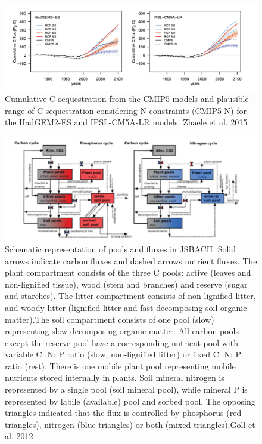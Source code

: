 \documentclass[
  12pt,
  oneside]{book}
\begin{document}
\begin{figure}

{\centering \includegraphics[width=0.8\linewidth]{figures/chap5/f520_zhaele} 

}

\caption{Cumulative C sequestration from the CMIP5 models and plausible range of C sequestration considering N constraints (CMIP5-N) for the HadGEM2-ES and IPSL-CM5A-LR models. Zhaele et al. 2015}\label{fig:f520}
\end{figure}

\begin{figure}

{\centering \includegraphics[width=0.8\linewidth]{figures/chap5/f521_goll_jsbach} 

}

\caption{Schematic representation of pools and fluxes in JSBACH. Solid arrows indicate carbon fluxes and dashed arrows nutrient fluxes. The plant compartment consists of the three C pools: active (leaves and non-lignified tissue), wood (stem and branches) and reserve (sugar and starches). The litter compartment consists of non-lignified litter, and woody litter (lignified litter and fast-decomposing soil organic matter).The soil compartment consists of one pool (slow) representing slow-decomposing organic matter. All carbon pools except the reserve pool have a corresponding nutrient pool with variable C :N: P ratio (slow, non-lignified litter) or fixed C :N: P ratio (rest). There is one mobile plant pool representing mobile nutrients stored internally in plants. Soil mineral nitrogen is represented by a single pool (soil mineral pool), while mineral P is represented by labile (available) pool and sorbed pool. The opposing triangles indicated that the flux is controlled by phosphorus (red triangles), nitrogen (blue triangles) or both (mixed triangles).Goll et al. 2012}\label{fig:f521}
\end{figure}
\end{document}
